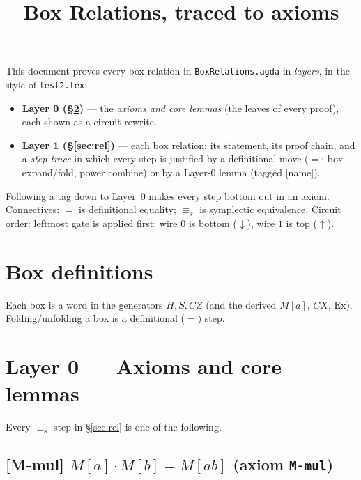 \documentclass[a4paper]{article}
\title{Box Relations, traced to axioms}
\date{}
\newcommand{\lem}[1]{\textsf{[#1]}}      %
\begin{document}
\maketitle

\noindent
This document proves every box relation in \texttt{BoxRelations.agda} in
\emph{layers}, in the style of \texttt{test2.tex}:

\begin{itemize}[nosep]
  \item \textbf{Layer 0 (\S\ref{sec:lib})} — the \emph{axioms and core lemmas}
        (the leaves of every proof), each shown as a circuit rewrite.
  \item \textbf{Layer 1 (\S\ref{sec:rel})} — each box relation: its statement, its
        proof chain, and a \emph{step trace} in which every step is justified by a
        definitional move ($=$: box expand/fold, power combine) or by a Layer-0
        lemma (tagged \lem{name}).
\end{itemize}
Following a tag down to Layer~0 makes every step bottom out in an axiom.
Connectives: $=$ is definitional equality; $\equiv_s$ is symplectic equivalence.
Circuit order: leftmost gate is applied first; wire $0$ is bottom ($\downarrow$),
wire $1$ is top ($\uparrow$).

\section{Box definitions}\label{sec:def}
Each box is a word in the generators $H,S,CZ$ (and the derived $M[a]$, $CX$,
$\mathrm{Ex}$). Folding/unfolding a box is a definitional ($=$) step.
\begin{center}\end{center}

\section{Layer 0 — Axioms and core lemmas}\label{sec:lib}
Every $\equiv_s$ step in \S\ref{sec:rel} is one of the following.

\subsection*{\lem{M-mul} \; $M[a]\cdot M[b] = M[ab]$ \hfill (axiom \texttt{M-mul})}
\begin{center}\end{center}
\end{document}
